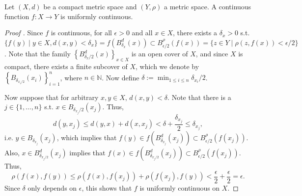 \begin{theorem}\label{thrm:cont_func_on_comp_metric_space_uniformly_continuous}
	Let $(X, d)$ be a compact metric space and $(Y, \rho)$ a metric space. A continuous function $f: X\to Y$ is uniformly continuous. 
\end{theorem}

\begin{proof}[Proof \cite{1605098}]
	Since $f$ is continuous, for all $\epsilon > 0$ and all $x\in X$, there exists a $\delta_x > 0$ s.t. $\{f(y)\mid y\in X, d(x, y) < \delta_x\} = f\left(B^{d}_{\delta_x}(x)\right) \subset B^{\rho}_{\epsilon/2}(f(x)) = \{z\in Y\mid \rho(z, f(x)) < \epsilon/2\}$. Note that the family $\left\{B_{\delta_x/2}^{d}(x)\right\}_{x\in X}$ is an open cover of $X$, and since $X$ is compact, there exists a finite subcover of $X$, which we denote by $\left\{B_{\delta_{x_i/2}}(x_i)\right\}_{i=1}^{n}$, where $n\in\mathbb N$. Now define $\delta := \min_{1 \leq i \leq n}\delta_{x_i}/2$.
	
	Now suppose that for arbitrary $x, y\in X$, $d(x, y) < \delta$. Note that there is a $j \in \{1, \dots, n\}$ s.t. $x\in B_{\delta_{x_{j}}/2}(x_{j})$. Thus, $$d(y, x_j)\leq d(y, x) + d(x, x_j) < \delta + \frac{\delta_{x_j}}{2} \leq \delta_{x_j},$$ i.e. $y\in B_{\delta_{x_j}}(x_j)$, which implies that $f(y)\in f\left(B^{d}_{\delta_{x_j}}(x_j)\right) \subset B_{\epsilon/2}^{\rho}(f(x_j))$. Also, $x\in B^{d}_{\delta_{x_j/2}}(x_j)$ implies that $f(x)\in f\left(B^{d}_{\delta_{x_j/2}}(x_j)\right) \subset B_{\epsilon/2}^{\rho}(f(x_j))$. Thus, $$\rho(f(x), f(y)) \leq \rho(f(x), f(x_j)) + \rho(f(x_j), f(y)) < \frac{\epsilon}{2} + \frac{\epsilon}{2} = \epsilon.$$ Since $\delta$ only depends on $\epsilon$, this shows that $f$ is uniformly continuous on $X$.
\end{proof}